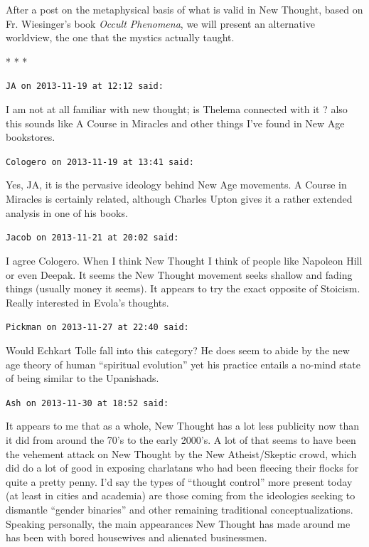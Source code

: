After a post on the metaphysical basis of what is valid in New Thought, based on Fr. Wiesinger's book \emph{Occult Phenomena}, we will present an alternative worldview, the one that the mystics actually taught.



\begin{center}* * *\end{center}

\begin{footnotesize}
\begin{sffamily}
\texttt{JA on 2013-11-19 at 12:12 said:}

I am not at all familiar with new thought; is Thelema connected with it ? also this sounds like A Course in Miracles and other things I've found in New Age bookstores.

\hfill

\texttt{Cologero on 2013-11-19 at 13:41 said:}

Yes, JA, it is the pervasive ideology behind New Age movements. A Course in Miracles is certainly related, although Charles Upton gives it a rather extended analysis in one of his books.

\hfill

\texttt{Jacob on 2013-11-21 at 20:02 said:}

I agree Cologero. When I think New Thought I think of people like Napoleon Hill or even Deepak. It seems the New Thought movement seeks shallow and fading things (usually money it seems). It appears to try the exact opposite of Stoicism. Really interested in Evola's thoughts.

\hfill

\texttt{Pickman on 2013-11-27 at 22:40 said:}

Would Echkart Tolle fall into this category? He does seem to abide by the new age theory of human ``spiritual evolution'' yet his practice entails a no-mind state of being similar to the Upanishads.

\hfill

\texttt{Ash on 2013-11-30 at 18:52 said:}

It appears to me that as a whole, New Thought has a lot less publicity now than it did from around the 70's to the early 2000's. A lot of that seems to have been the vehement attack on New Thought by the New Atheist/Skeptic crowd, which did do a lot of good in exposing charlatans who had been fleecing their flocks for quite a pretty penny. I'd say the types of ``thought control'' more present today (at least in cities and academia) are those coming from the ideologies seeking to dismantle ``gender binaries'' and other remaining traditional conceptualizations. Speaking personally, the main appearances New Thought has made around me has been with bored housewives and alienated businessmen.


\end{sffamily}
\end{footnotesize}
